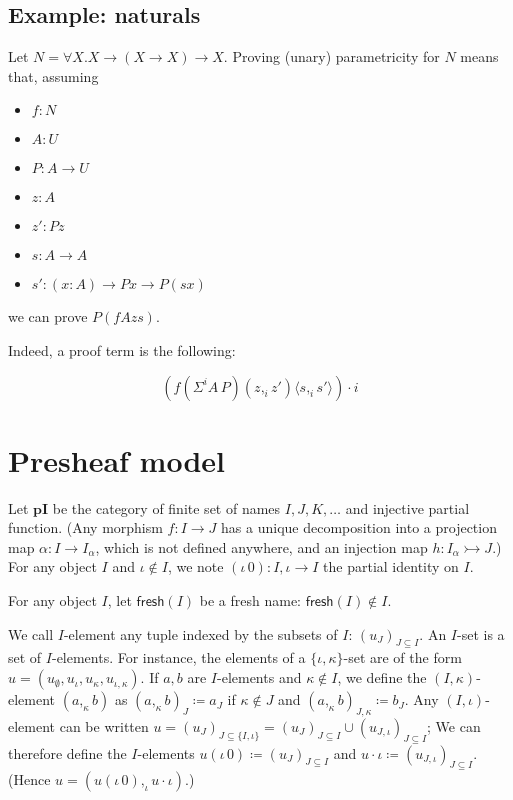 \documentclass[english]{PaperTools/latex/lipics}
\newcommand\CP[3]{(#2,_{#1} #3)}
\newcommand\param[1]{\!\cdot\!#1}
\newcommand\ip[3]{Σ^{#1} {#2}\,{#3}}
\newcommand\fp[3]{⟨#2 ,_{#1} #3⟩}
\def\pI{\ensuremath{\mathbf{pI}}}
\def\fresh#1{\mathsf{fresh}(#1)}
\begin{document}
\subsection{Example: naturals}
Let $N = ∀X. X → (X → X) → X$.
Proving (unary) parametricity for $N$ means that, assuming
\begin{itemize}
\item $f : N$
\item $A : U$
\item $P : A → U$
\item $z : A$
\item $z' : P z$
\item $s : A → A$
\item $s' : (x:A) → P x → P (s x)$
\end{itemize}
we can prove $P (f A z s)$.

Indeed, a proof term is the following:

\[
(f (\ip i A P) \CP i z {z'} \fp i s {s'}) \param i
\]

\section{Presheaf model}

Let \pI{} be the category of finite set of names $I,J,K,…$ and injective
partial function.  (Any morphism $f : I → J$ has a unique decomposition
into a projection map $α : I → I_α$, which is not defined anywhere, and
an injection map $h : I_α ↣ J$.)  For any object $I$ and $ι ∉ I$, we note
$(ι \, 0) : I,ι → I$ the partial identity on $I$.


For any object $I$, let $\fresh{I}$ be a fresh name: $\fresh{I} ∉ I$.

\bigskip
We call $I$-element any tuple indexed by the subsets of $I$: $(u_J)_{J ⊆ I}$.
An $I$-set is a set of $I$-elements.  For instance, the elements of a
$\{ι,κ\}$-set are of the form $u = (u_∅,u_ι,u_κ,u_{ι,κ})$.
%
If $a,b$ are $I$-elements and $κ ∉ I$, we define the $(I,κ)$-element
$(a ,_κ b)$ as $(a ,_κ b)_J ≔ a_J$ if $κ ∉ J$ and $(a ,_κ b)_{J,κ} ≔ b_J$.
%
Any $(I,ι)$-element can be written $u = (u_J)_{J ⊆ \{I,ι\}} = (u_J)_{J ⊆ I} ∪ (u_{J,ι})_{J ⊆ I}$;
We can therefore define the $I$-elements $u (ι\,0) ≔ (u_J)_{J ⊆ I}$ and $u · ι ≔ (u_{J,ι})_{J ⊆ I}$.
(Hence $u = (u (ι\,0) ,_ι u · ι)$.)
\end{document}

